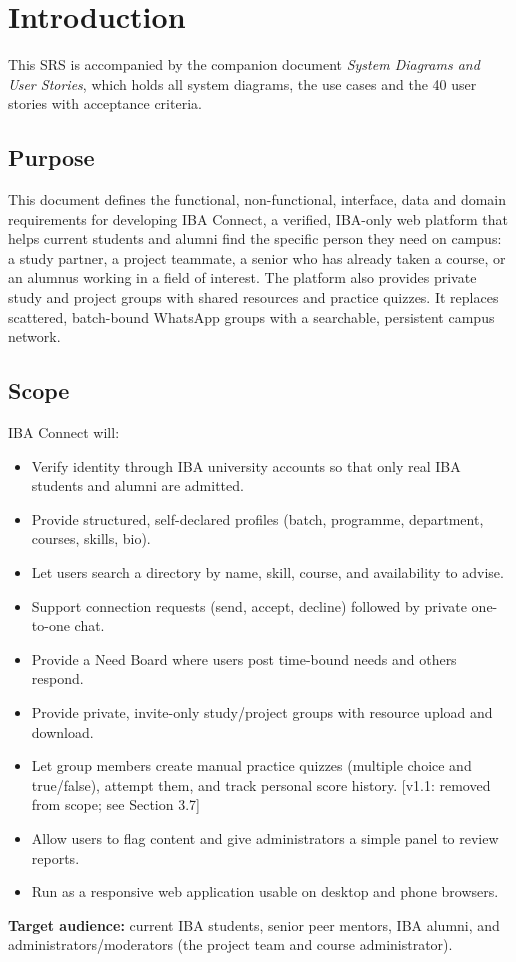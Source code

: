 \documentclass[10pt,a4paper]{article}
\newcommand{\vone}[1]{\textcolor{accent}{\small[v1.1: #1]}}
\begin{document}
\newpage
\tableofcontents
\newpage

\section{Introduction}
This SRS is accompanied by the companion document \emph{System Diagrams and User Stories}, which holds all system diagrams, the use cases and the 40 user stories with acceptance criteria.

\subsection{Purpose}
This document defines the functional, non-functional, interface, data and domain requirements for developing IBA Connect, a verified, IBA-only web platform that helps current students and alumni find the specific person they need on campus: a study partner, a project teammate, a senior who has already taken a course, or an alumnus working in a field of interest. The platform also provides private study and project groups with shared resources and practice quizzes. It replaces scattered, batch-bound WhatsApp groups with a searchable, persistent campus network.

\subsection{Scope}
IBA Connect will:
\begin{itemize}
\item Verify identity through IBA university accounts so that only real IBA students and alumni are admitted.
\item Provide structured, self-declared profiles (batch, programme, department, courses, skills, bio).
\item Let users search a directory by name, skill, course, and availability to advise.
\item Support connection requests (send, accept, decline) followed by private one-to-one chat.
\item Provide a Need Board where users post time-bound needs and others respond.
\item Provide private, invite-only study/project groups with resource upload and download.
\item Let group members create manual practice quizzes (multiple choice and true/false), attempt them, and track personal score history. \vone{removed from scope; see Section 3.7}
\item Allow users to flag content and give administrators a simple panel to review reports.
\item Run as a responsive web application usable on desktop and phone browsers.
\end{itemize}
\textbf{Target audience:} current IBA students, senior peer mentors, IBA alumni, and administrators/moderators (the project team and course administrator).
\end{document}
